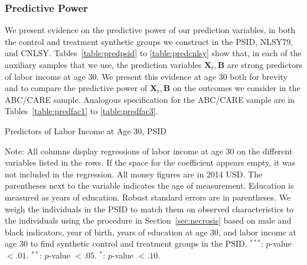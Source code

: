 \subsubsection{Predictive Power} \label{appendix:pred}

\noindent We present evidence on the predictive power of our prediction variables, in both the control and treatment synthetic groups we construct in the PSID, NLSY79, and CNLSY. Tables~\ref{table:predpsid} to \ref{table:predcnlsy} show that, in each of the auxiliary samples that we use, the prediction variables $\bm{X}_{t}, \bm{B}$ are strong predictors of labor income at age 30. We present this evidence at age 30 both for brevity and to compare the predictive power of $\bm{X}_{t},\bm{B}$ on the outcomes we consider in the ABC/CARE sample. Analogous specification for the ABC/CARE sample are in Tables~\ref{table:predfac1} to \ref{table:predfac3}.\\

\begin{table} 
\begin{threeparttable}
\caption{Predictors of Labor Income at Age 30, PSID}
\label{table:predpsid}
\centering 
\footnotesize

\begin{tablenotes}
\footnotesize
\item Note: All columns display regressions of labor income at age 30 on the different variables listed in the rows. If the space for the coefficient appears empty, it was not included in the regression. All money figures are in 2014 USD. The parentheses next to the variable indicates the age of measurement. Education is measured as years of education. Robust standard errors are in parentheses. We weigh the individuals in the PSID to match them on observed characteristics to the individuals using the procedure in Section~\ref{sec:necrosis} based on male and black indicators, year of birth, years of education at age 30, and labor income at age 30 to find synthetic control and treatment groups in the PSID. $^{***}$: $p$-value $< .01$. $^{**}$: $p$-value $< .05$. $^{*}$: $p$-value $< .10$.
\end{tablenotes}
\end{threeparttable}
\end{table}

